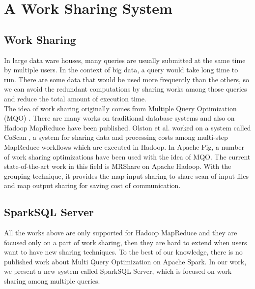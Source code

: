 
\chapter{A Work Sharing System} %

\label{Chapter3} %



\section{Work Sharing}

In large data ware houses, many queries are usually submitted at the same time by multiple users. In the context of big data, a query would take long time to run. There are some data that would be used more frequently than the others, so we can avoid the redundant computations by sharing works among those queries and reduce the total amount of execution time. \\
The idea of work sharing originally comes from Multiple Query Optimization (MQO) \cite{sellis1988}. There are many works on traditional database systems \cite{cosar1993} \cite{bayir2007} \cite{georgios2012} \cite{stavros2005} and also on Hadoop MapReduce have been published. Olston et al. worked on a system called CoScan \cite{olston2011}, a system for sharing data and processing costs among multi-step MapReduce workflows which are executed in Hadoop. In Apache Pig, a number of work sharing optimizations \cite{pigmqo} have been used with the idea of MQO. The current state-of-the-art work in this field is MRShare\cite{nikiel2010} on Apache Hadoop. With the grouping technique, it provides the map input sharing to share scan of input files and map output sharing for saving cost of communication.\\

\section{SparkSQL Server}
All the works above are only supported for Hadoop MapReduce and they are focused only on a part of work sharing, then they are hard to extend when users want to have new sharing techniques. To the best of our knowledge, there is no published work about Multi Query Optimization on Apache Spark. In our work, we present a new system called SparkSQL Server, which is focused on work sharing among multiple queries.\\

